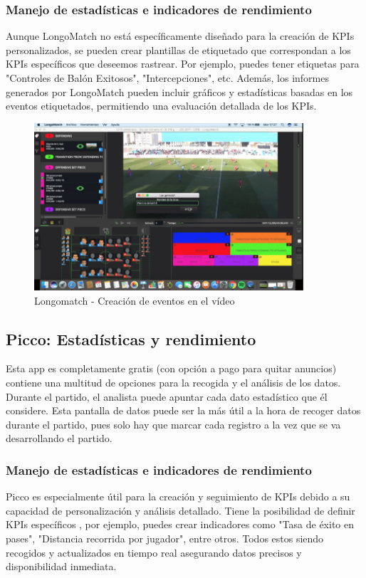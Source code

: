 \subsubsection{Manejo de estadísticas e indicadores de rendimiento}
Aunque LongoMatch no está específicamente diseñado para la creación de KPIs personalizados, se pueden crear plantillas de etiquetado que correspondan a los KPIs específicos que deseemos rastrear. Por ejemplo, puedes tener etiquetas para "Controles de Balón Exitosos", "Intercepciones", etc. Además, los informes generados por LongoMatch pueden incluir gráficos y estadísticas basadas en los eventos etiquetados, permitiendo una evaluación detallada de los KPIs.

\begin{figure}[H]
    \centering
    \includegraphics[width=10cm]{archivos/tfg_jorge/longomatch_eventos_live_video}
    \caption{Longomatch - Creación de eventos en el vídeo}\label{sistemass2}
\end{figure}

\subsection{Picco: Estadísticas y rendimiento}
Esta app es completamente gratis (con opción a pago para quitar anuncios) contiene una multitud de opciones para la recogida y el análisis de los datos. Durante el partido, el analista puede apuntar cada dato estadístico que él considere.
Esta pantalla de datos puede ser la más útil a la hora de recoger datos durante el partido, pues solo hay que  marcar cada registro a la vez que se va desarrollando el partido.

\subsubsection{Manejo de estadísticas e indicadores de rendimiento}
Picco es especialmente útil para la creación y seguimiento de KPIs debido a su capacidad de personalización y análisis detallado. Tiene la posibilidad de definir KPIs específicos , por ejemplo, puedes crear indicadores como "Tasa de éxito en pases", "Distancia recorrida por jugador", entre otros. Todos estos siendo recogidos y actualizados en tiempo real asegurando datos precisos y disponibilidad inmediata.

